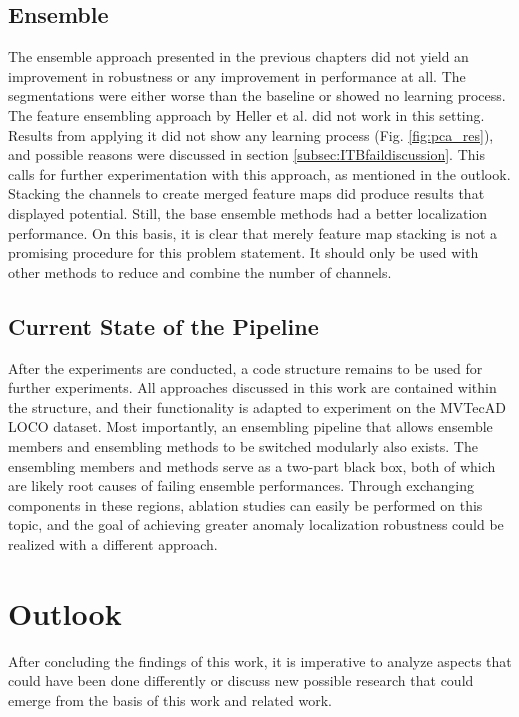 \subsection{Ensemble}
The ensemble approach presented in the previous chapters did not yield an improvement in robustness or any improvement in performance at all. The segmentations were either 
worse than the baseline or showed no learning process. The feature ensembling approach by Heller et al. \cite{EnsembleHeller2023} did not work in this setting. Results from applying it did not show any learning 
process (Fig. \ref{fig:pca_res}), and possible reasons were discussed in section \ref{subsec:ITBfaildiscussion}. This calls for further experimentation with this approach, as mentioned 
in the outlook. Stacking the channels to create merged feature maps did produce results that displayed potential. Still, the base ensemble methods had a better localization 
performance. On this basis, it is clear that merely feature map stacking is not a promising procedure for this problem statement. It should only be used  
with other methods to reduce and combine the number of channels.

\subsection{Current State of the Pipeline}
After the experiments are conducted, a code structure remains to be used for further experiments. 
All approaches discussed in this work are contained within the structure, and their functionality is adapted to experiment on the MVTecAD LOCO \cite{LOCODentsAndScratchesBergmann2022} dataset. Most 
importantly, an ensembling pipeline that allows ensemble members and ensembling methods to be switched modularly also exists. The ensembling members and methods 
serve as a two-part black box, both of which are likely root causes of failing ensemble performances. 
Through exchanging components in these regions, ablation studies can easily be performed on this topic, and the goal of achieving greater anomaly localization robustness 
could be realized with a different approach.


\section{Outlook}
\label{sec:finaloutlook}

After concluding the findings of this work, it is imperative to analyze aspects that could have been done differently or discuss new possible research that could emerge from 
the basis of this work and related work.\newline

